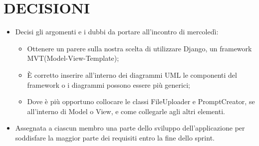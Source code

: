 \documentclass[5pt]{article}
\begin{document}
\section{DECISIONI}
\begin{itemize}
    \item Decisi gli argomenti e i dubbi da portare all'incontro di mercoledì:
    \begin{itemize}
    	\item Ottenere un parere sulla nostra scelta di utilizzare Django, un framework MVT(Model-View-Template);
    	\item È corretto inserire all'interno dei diagrammi UML le componenti del framework o i diagrammi possono essere più generici;
    	\item Dove è più opportuno collocare le classi FileUploader e PromptCreator, se all'interno di Model o View, e come collegarle agli altri elementi.
    \end{itemize}
    \item Assegnata a ciascun membro una parte dello sviluppo dell'applicazione per soddisfare la maggior parte dei requisiti entro la fine dello sprint.
\end{itemize}
\end{document}
